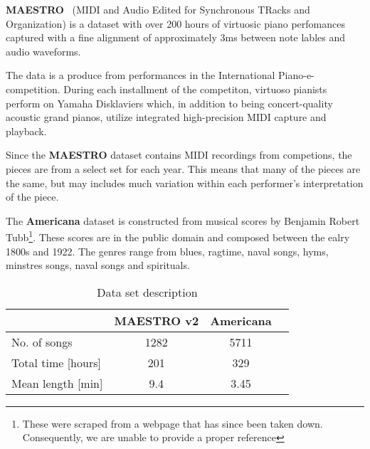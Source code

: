 \documentclass{IEEEtran}
\begin{document}
        \textbf{MAESTRO}~\cite{maestrodataset}
        (MIDI and Audio Edited for Synchronous TRacks and Organization)
        is a dataset with over 200 hours of virtuosic piano perfomances captured with 
        a fine alignment of approximately 3ms between note lables and audio waveforms.

        The data is a produce from performances in the International Piano-e-competition.
        During each installment of the competiton, virtuoso pianists perform on Yamaha
        Disklaviers which, in addition to being concert-quality acoustic grand pianos,
        utilize integrated high-precision MIDI capture and playback.
            
        Since the \textbf{MAESTRO} dataset contains MIDI recordings from competions, 
        the pieces are from a select set for each year. This means that many of the 
        pieces are the same, but may includes much variation within each
        performer's interpretation of the piece. 

        The \textbf{Americana} dataset is constructed from musical scores by 
        Benjamin Robert Tubb\footnote{These were scraped from a webpage that has 
        since been taken down. Consequently, we are unable to provide a proper 
        reference}. These scores are in the public domain and composed between
        the ealry 1800s and 1922. The genres range from blues, ragtime, naval songs,
        hyms, minstres songs, naval songs and spirituals. 
    
    \begin{table}
    \begin{center}
        \caption{
            Data set description
            \label{tab:data}
        }
        \begin{tabular}{l c c c} \hline
            & MAESTRO v2 & Americana \\ \hline\hline
        No. of songs & 1282 & 5711 \\ \hline
        Total time [hours] & 201 & 329 \\ \hline
        Mean length [min] & 9.4 & 3.45  \\ \hline
       \end{tabular}
    \end{center}
    \end{table}

\end{document}
